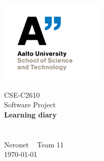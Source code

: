 \begin{titlepage}
\includegraphics[height=4cm]{../gfx/logo_aalto.png}
\vspace*{3cm}
\begin{center}
\large CSE-C2610 \\ Software Project \\[.6cm]
\textbf{\Large Learning diary} \\[0.4cm]
\huge \lastname{} \\[1cm]
\large \firstname{} \lastname{} ~ \studentid{} \\
\large Neronet ~ Team 11 \\[0.3cm]
\large \today{} \\
\end{center}
\end{titlepage}
\tableofcontents
\newpage